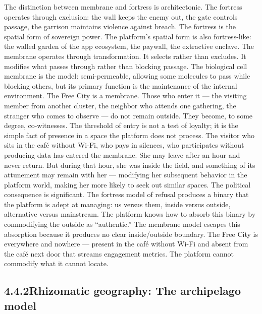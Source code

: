 The distinction between membrane and fortress is architectonic. The fortress operates through exclusion: the wall keeps the enemy out, the gate controls passage, the garrison maintains violence against breach. The fortress is the spatial form of sovereign power. The platform’s spatial form is also fortress-like: the walled garden of the app ecosystem, the paywall, the extractive enclave. The membrane operates through transformation. It selects rather than excludes. It modifies what passes through rather than blocking passage. The biological cell membrane is the model: semi-permeable, allowing some molecules to pass while blocking others, but its primary function is the maintenance of the internal environment. The Free City is a membrane. Those who enter it — the visiting member from another cluster, the neighbor who attends one gathering, the stranger who comes to observe — do not remain outside. They become, to some degree, co-witnesses. The threshold of entry is not a test of loyalty; it is the simple fact of presence in a space the platform does not process. The visitor who sits in the café without Wi-Fi, who pays in silences, who participates without producing data has entered the membrane. She may leave after an hour and never return. But during that hour, she was inside the field, and something of its attunement may remain with her — modifying her subsequent behavior in the platform world, making her more likely to seek out similar spaces. The political consequence is significant. The fortress model of refusal produces a binary that the platform is adept at managing: us versus them, inside versus outside, alternative versus mainstream. The platform knows how to absorb this binary by commodifying the outside as “authentic.” The membrane model escapes this absorption because it produces no clear inside/outside boundary. The Free City is everywhere and nowhere — present in the café without Wi-Fi and absent from the café next door that streams engagement metrics. The platform cannot commodify what it cannot locate.

\subsection{4.4.2\quad Rhizomatic geography: The archipelago model}

